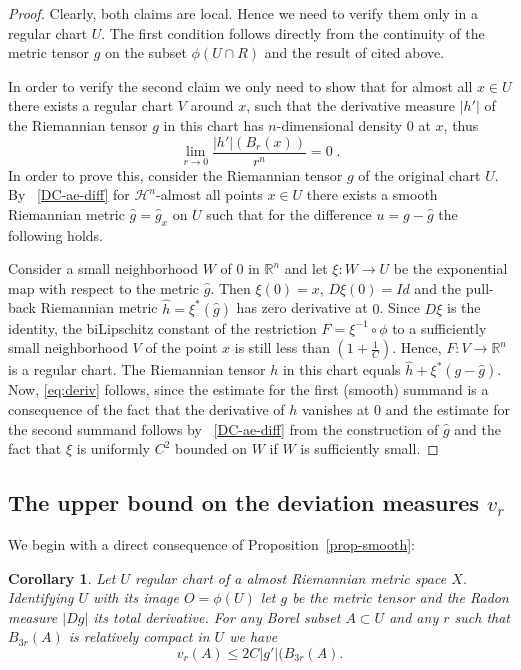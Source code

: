 \documentclass[12pt,leqno]{amsart}
\numberwithin{equation}{section}
\newtheorem{cor}[thm]{Corollary}
\theoremstyle{definition}
\theoremstyle{remark}
\newcommand{\pref}[1]{Proposition~\ref{#1}}
\newcommand{\R}{\mathbb{R}}
\begin{document}
\begin{proof}
Clearly, both claims are local. Hence we need to verify them only in a regular chart $U$.  The first condition
follows directly from the continuity of the metric tensor $g$ on the subset $\phi(U\cap R)$ and the result of \cite{Goffmann}
cited above.

 In order to verify the second claim we only need to show   that for almost all $x\in U$ there exists a
 regular chart $V$
 around $x$, such that the derivative measure $|h'|$ of  the Riemannian tensor $g$ in this  chart has $n$-dimensional density $0$
 at $x$, thus
 \begin{equation} \label{eq:deriv}
 \lim _{r\to 0} \frac {|h'| (B_r (x))} {r^n} =0 \;.
 \end{equation}
 In order to prove this, consider the Riemannian tensor $g$ of the original chart $U$.  By ~\eqref{DC-ae-diff} for $\mathcal H^n$-almost all
 points $x\in U$ there exists a  smooth Riemannian metric $\hat g =\hat g_x$ on $U$ such that  for the difference
 $u=g-\hat g$  the following holds.

Consider a small neighborhood $W$ of $0$ in $\R^n$ and let $\xi :W\to U$ be the exponential map with respect to the metric
$\hat g$. Then $\xi (0)=x$, $D\xi  (0) =Id$  and  the  pull-back Riemannian metric $\hat h= \xi^{\ast}  (\hat g)$  has zero derivative at $0$.    Since $D\xi$ is the identity, the biLipschitz constant of the restriction $F=\xi ^{-1} \circ \phi$ to a sufficiently
small neighborhood $V$ of the point $x$ is still less than $(1 + \frac 1 C)$.      Hence, $F:V\to \R^n$ is a regular chart. The Riemannian tensor $h$ in this chart equals $\hat h  +\xi^{\ast } (g-\hat g)$.
Now, \eqref{eq:deriv} follows, since the estimate for the first (smooth) summand is a consequence of the fact that the derivative of $h$ vanishes at $0$ and  the estimate for the second summand follows by  ~\eqref{DC-ae-diff} from the construction of $\hat g$ and the fact that $\xi$ is uniformly $C^2$ bounded on $W$ if $W$ is sufficiently small.  
\end{proof}












\subsection{The upper bound on the deviation  measures $v_r$}
We begin with a direct consequence of \pref{prop-smooth}:
\begin{cor} \label{cor-dc-vr}
Let $U$ regular chart of a almost Riemannian metric space $X$. Identifying $U$ with its image $O=\phi (U)$ let
$g$ be the metric tensor and the Radon measure $|Dg|$ its total derivative.  For any Borel subset $A\subset U$ and any $r$
such that $B_{3r} (A)$ is relatively compact in $U$ we have $$v_r (A) \leq 2 C |g'| (B_{3r} (A) .$$
\end{cor}
\end{document}
